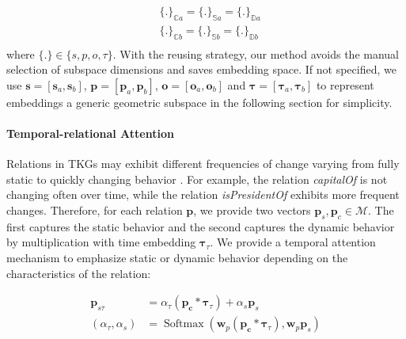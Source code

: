 \documentclass[letterpaper]{article} %
\begin{document}
\begin{equation}
    \begin{split}
        &\{.\}_{\mathbb{C}a}=\{.\}_{\mathbb{S}a}=\{.\}_{\mathbb{D}a}\\
        &\{.\}_{\mathbb{C}b}=\{.\}_{\mathbb{S}b}=\{.\}_{\mathbb{D}b}\\
    \end{split}
\end{equation}
where $\{.\} \in \{s, p, o, \tau \}$. With the reusing strategy, our method avoids the manual selection of subspace dimensions and saves embedding space. If not specified, we use $\boldsymbol{s}=[\boldsymbol{s}_{a},\boldsymbol{s}_{b}]$, $\boldsymbol{p}=[\boldsymbol{p}_{a}, \boldsymbol{p}_{b}]$, $\boldsymbol{o}=[\boldsymbol{o}_{a},\boldsymbol{o}_{b}]$ and $\boldsymbol{\tau}=[\boldsymbol{\tau}_{a},\boldsymbol{\tau}_{b}]$ to represent embeddings a generic geometric subspace in the following section for simplicity.

\paragraph{\textbf{Temporal-relational Attention}}
Relations in TKGs may exhibit different
frequencies of change varying from fully static to quickly changing behavior \cite{tcomplexlacroix2020tensor}.
For example, the relation \textit{capitalOf} is not changing often over time, while the relation \textit{isPresidentOf} exhibits more frequent changes.
Therefore, for each relation $\boldsymbol{p}$, we provide two vectors $\boldsymbol{p}_s, \boldsymbol{p}_{c} \in \mathcal{M}$. The first captures the static behavior and the second captures the dynamic behavior by multiplication with time embedding $\boldsymbol{\tau}_\tau$. We provide a temporal attention mechanism to emphasize static or dynamic behavior depending on the characteristics of the relation:

\begin{equation}
\begin{split}
    \boldsymbol{p}_{s\tau} &= \alpha_\tau \left(\boldsymbol{p_c} * \boldsymbol{\tau}_\tau\right) + \alpha_s \boldsymbol{p}_s \\
    \left(\alpha_\tau, \alpha_s \right)&=  \operatorname{Softmax}\left(\mathbf{w}_p \left(\boldsymbol{p_c} * \boldsymbol{\tau}_\tau \right) , \mathbf{w}_p \boldsymbol{p}_s \right)
    \label{eq:temporalAttention}
\end{split}
\end{equation}
\end{document}
